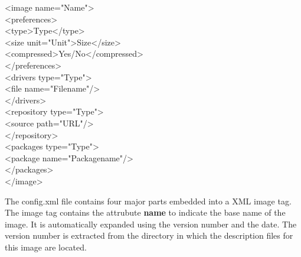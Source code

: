 \begin{itemize}
      \begin{Command}{12cm}
      <image name="Name">\\
      \hspace*{1cm}<preferences>\\
      \hspace*{2cm}<type>Type</type>\\
      \hspace*{2cm}<size unit="Unit">Size</size>\\
      \hspace*{2cm}<compressed>Yes/No</compressed>\\
      \hspace*{1cm}</preferences>\\
      \hspace*{1cm}<drivers type="Type">\\
      \hspace*{2cm}<file name="Filename"/>\\
      \hspace*{1cm}</drivers>\\
      \hspace*{1cm}<repository type="Type">\\
      \hspace*{2cm}<source path="URL"/>\\
      \hspace*{1cm}</repository>\\
      \hspace*{1cm}<packages type="Type">\\
      \hspace*{2cm}<package name="Packagename"/>\\
      \hspace*{1cm}</packages>\\
      </image>
	  \end{Command}

      The config.xml file contains four major parts embedded into a
      XML image tag. The image tag contains the attrubute \textbf{name}
      to indicate the base name of the image. It is automatically expanded
      using the version number and the date. The version number is
      extracted from the directory in which the description files for
      this image are located.


\end{itemize}
